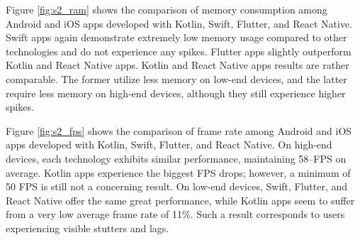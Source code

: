 Figure \ref{fig:s2_ram} shows the comparison of memory consumption among Android and iOS apps developed with Kotlin, Swift, Flutter, and React Native. Swift apps again demonstrate extremely low memory usage compared to other technologies and do not experience any spikes. Flutter apps slightly outperform Kotlin and React Native apps. Kotlin and React Native apps results are rather comparable. The former utilize less memory on low-end devices, and the latter require less memory on high-end devices, although they still experience higher spikes.

\bigskip

Figure \ref{fig:s2_fps} shows the comparison of frame rate among Android and iOS apps developed with Kotlin, Swift, Flutter, and React Native. On high-end devices, each technology exhibits similar performance, maintaining 58--FPS on average. Kotlin apps experience the biggest FPS drops; however, a minimum of 50 FPS is still not a concerning result. On low-end devices, Swift, Flutter, and React Native offer the same great performance, while Kotlin apps seem to suffer from a very low average frame rate of 11\%. Such a result corresponds to users experiencing visible stutters and lags. 

\clearpage
